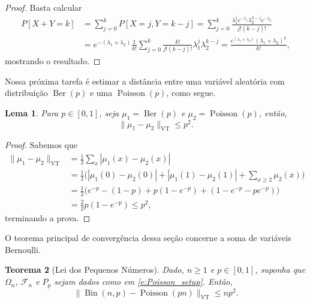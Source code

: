 \documentclass[reqno, final]{book}
\newcommand*\1{\mathds{1}}
\newtheorem{theorem}{Teorema}[section]
\newtheorem{lemma}[theorem]{Lema}
\DeclareMathOperator{\Poisson}{Poisson}
\DeclareMathOperator{\Ber}{Ber}
\DeclareMathOperator{\Bin}{Bin}
\DeclareMathOperator{\VT}{VT}
\begin{document}
\begin{proof}
Basta calcular
\begin{equation}
  \begin{split}
    P[X+Y = k] & = \sum_{j = 0}^k P[X = j, Y = k-j] = \sum_{j = 0}^k \frac{\lambda_1^j e^{-\lambda_1} \lambda_2^{k-j} e^{-\lambda_2}}{j! (k-j)!}\\
    & = e^{-(\lambda_1 + \lambda_2)} \frac{1}{k!} \sum_{j = 0}^k \frac{k!}{j! (k-j)!} \lambda_1^j \lambda_2^{k-j} = \frac{e^{(\lambda_1 + \lambda_2)} (\lambda_1 + \lambda_2)^k}{k!},
  \end{split}
\end{equation}
mostrando o resultado.
\end{proof}

Nossa próxima tarefa é estimar a distância entre uma variável aleatória com distribuição $\Ber(p)$ e uma $\Poisson(p)$, como segue.

\begin{lemma}
\label{l:vt_ber_poiss}
Para $p \in [0,1]$, seja $\mu_1 = \Ber(p)$ e $\mu_2 = \Poisson(p)$, então,
\begin{equation}
  \lVert \mu_1 - \mu_2 \rVert_{\VT} \leq p^2.
\end{equation}
\end{lemma}

\begin{proof}
Sabemos que
\begin{equation}
  \begin{split}
    \lVert \mu_1 - \mu_2 \rVert_{\VT} & = \frac{1}{2} \sum_{x} |\mu_1(x) - \mu_2(x)|\\
    & = \frac{1}{2} \Big( |\mu_1(0) - \mu_2(0)| + |\mu_1(1) - \mu_2(1)| + \sum_{x \geq 2} \mu_2(x) \Big)\\
    & = \frac{1}{2} \Big( e^{-p} - (1-p) + p(1-e^{-p}) + (1 - e^{-p} - p e^{-p}) \Big)\\
    & = \frac{2}{2} p (1 - e^{-p}) \leq p^2,
  \end{split}
\end{equation}
terminando a prova.
\end{proof}

O teorema principal de convergência dessa seção concerne a soma de variáveis Bernoulli.

\begin{theorem}[Lei dos Pequenos Números]
  \label{t:lei_peq_numeros}
  Dado, $n \geq 1$ e $p \in [0,1]$, suponha que $\Omega_n$, $\mathcal{F}_n$ e $P_p$ sejam dados como em \eqref{e:Poisson_setup}.
  Então,
  \begin{equation}
    \lVert \Bin(n,p) - \Poisson(pn) \rVert_{\VT} \leq n p^2.
  \end{equation}
\end{theorem}
\end{document}
